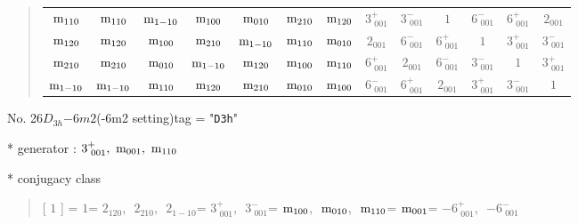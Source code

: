 \documentclass[fleqn,10pt,landscape]{jsarticle}
\begin{document}
\begin{quote}
\begin{tabular}{ccccccccccccc}
$ {\rm m}_{110} $ & $ {\rm m}_{110} $ & $ {\rm m}_{1-10} $ & $ {\rm m}_{100} $ & $ {\rm m}_{010} $ & $ {\rm m}_{210} $ & $ {\rm m}_{120} $ & $ 3^{+}_{\,\,001} $ & $ 3^{-}_{\,\,001} $ & $ 1 $ & $ 6^{-}_{\,\,001} $ & $ 6^{+}_{\,\,001} $ & $ 2{}_{001} $ \\
$ {\rm m}_{120} $ & $ {\rm m}_{120} $ & $ {\rm m}_{100} $ & $ {\rm m}_{210} $ & $ {\rm m}_{1-10} $ & $ {\rm m}_{110} $ & $ {\rm m}_{010} $ & $ 2{}_{001} $ & $ 6^{-}_{\,\,001} $ & $ 6^{+}_{\,\,001} $ & $ 1 $ & $ 3^{+}_{\,\,001} $ & $ 3^{-}_{\,\,001} $ \\
$ {\rm m}_{210} $ & $ {\rm m}_{210} $ & $ {\rm m}_{010} $ & $ {\rm m}_{1-10} $ & $ {\rm m}_{120} $ & $ {\rm m}_{100} $ & $ {\rm m}_{110} $ & $ 6^{+}_{\,\,001} $ & $ 2{}_{001} $ & $ 6^{-}_{\,\,001} $ & $ 3^{-}_{\,\,001} $ & $ 1 $ & $ 3^{+}_{\,\,001} $ \\
$ {\rm m}_{1-10} $ & $ {\rm m}_{1-10} $ & $ {\rm m}_{110} $ & $ {\rm m}_{120} $ & $ {\rm m}_{210} $ & $ {\rm m}_{010} $ & $ {\rm m}_{100} $ & $ 6^{-}_{\,\,001} $ & $ 6^{+}_{\,\,001} $ & $ 2{}_{001} $ & $ 3^{+}_{\,\,001} $ & $ 3^{-}_{\,\,001} $ & $ 1 $ \\
 \hline \hline
\end{tabular}
\end{quote}

\newpage

No. 26\quad$D_{3h}$\quad$-6m2$\quad(-6m2 setting)\quad[ hexagonal ]
tag = "{\tt D3h}"

* generator : $3^{+}_{\,\,001},\,\,{\rm m}_{001},\,\,{\rm m}_{110}$

* conjugacy class
\begin{quote}
[ $1$ ] = \quad $1$\newline[ $2{}_{120}$ ] = \quad $2{}_{120}$,\,\, $2{}_{210}$,\,\, $2{}_{1-10}$\newline[ $3^{+}_{\,\,001}$ ] = \quad $3^{+}_{\,\,001}$,\,\, $3^{-}_{\,\,001}$\newline[ ${\rm m}_{100}$ ] = \quad ${\rm m}_{100}$,\,\, ${\rm m}_{010}$,\,\, ${\rm m}_{110}$\newline[ ${\rm m}_{001}$ ] = \quad ${\rm m}_{001}$\newline[ $-6^{+}_{\,\,001}$ ] = \quad $-6^{+}_{\,\,001}$,\,\, $-6^{-}_{\,\,001}$\newline
\end{quote}
\end{document}
